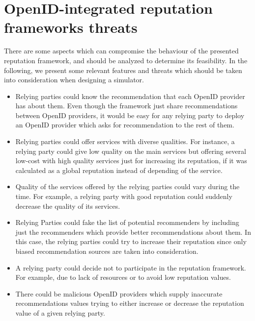 \documentclass{llncs}
\begin{document}
\section{OpenID-integrated reputation frameworks threats}\label{sec:features}

There are some aspects which can compromise the behaviour of the presented reputation framework, and should be analyzed to determine its feasibility. In the following, we present some relevant features and threats which should be taken into consideration when designing a simulator. 

\begin{itemize}

\item Relying parties could know the recommendation that each OpenID provider has about them. Even though the framework just share recommendations between OpenID providers, it would be easy for any relying party to deploy an OpenID provider which asks for recommendation to the rest of them.   

\item Relying parties could offer services with diverse qualities. For instance, a relying party could give low quality on the main services but offering several low-cost with high quality services just for increasing its reputation, if it was calculated as a global reputation instead of depending of the service.


\item Quality of the services offered by the relying parties could vary during the time. For example, a relying party with good reputation could suddenly decrease the quality of its services.


\item Relying Parties could fake the list of potential recommenders by including just the recommenders which provide better recommendations about them. In this case, the relying parties could try to increase their reputation since only biased recommendation sources are taken into consideration. 

\item A relying party could decide not to participate in the reputation framework. For example, due to lack of resources or to avoid low reputation values.


\item There could be malicious OpenID providers which supply inaccurate recommendations values trying to either increase or decrease the reputation value of a given relying party.



\end{itemize}
\end{document}
